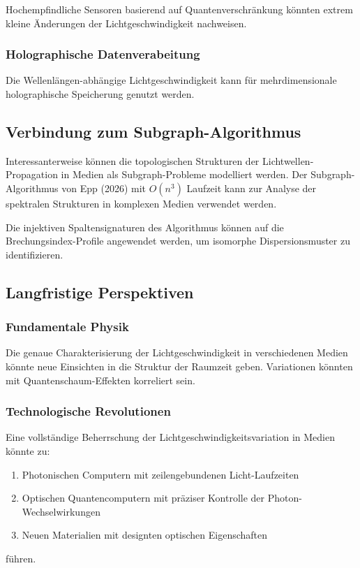 \documentclass[12pt,a4paper,oneside]{article}
\theoremstyle{definition}
\theoremstyle{remark}
\begin{document}
Hochempfindliche Sensoren basierend auf Quantenverschränkung könnten extrem kleine Änderungen der Lichtgeschwindigkeit nachweisen.

\subsubsection{Holographische Datenverabeitung}

Die Wellenlängen-abhängige Lichtgeschwindigkeit kann für mehrdimensionale holographische Speicherung genutzt werden.

\subsection{Verbindung zum Subgraph-Algorithmus}

Interessanterweise können die topologischen Strukturen der Lichtwellen-Propagation in Medien als Subgraph-Probleme modelliert werden. Der Subgraph-Algorithmus von Epp (2026) mit $O(n^3)$ Laufzeit kann zur Analyse der spektralen Strukturen in komplexen Medien verwendet werden.

Die injektiven Spaltensignaturen des Algorithmus können auf die Brechungsindex-Profile angewendet werden, um isomorphe Dispersionsmuster zu identifizieren.

\subsection{Langfristige Perspektiven}

\subsubsection{Fundamentale Physik}

Die genaue Charakterisierung der Lichtgeschwindigkeit in verschiedenen Medien könnte neue Einsichten in die Struktur der Raumzeit geben. Variationen könnten mit Quantenschaum-Effekten korreliert sein.

\subsubsection{Technologische Revolutionen}

Eine vollständige Beherrschung der Lichtgeschwindigkeitsvariation in Medien könnte zu:
\begin{enumerate}
    \item Photonischen Computern mit zeilengebundenen Licht-Laufzeiten
    \item Optischen Quantencomputern mit präziser Kontrolle der Photon-Wechselwirkungen
    \item Neuen Materialien mit designten optischen Eigenschaften
\end{enumerate}
führen.
\end{document}
